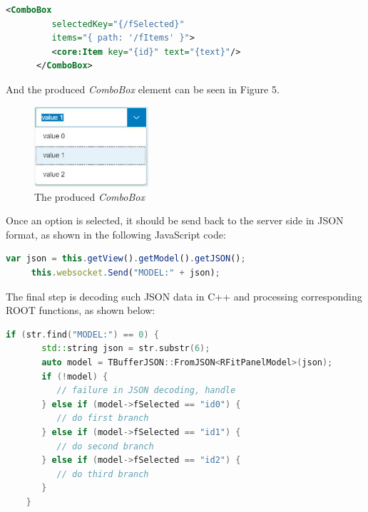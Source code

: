 \documentclass[a4paper]{jpconf}
\begin{document}
\begin{lstlisting}[language=XML,numbers=none]
      <ComboBox
         selectedKey="{/fSelected}"
         items="{ path: '/fItems' }">
         <core:Item key="{id}" text="{text}"/>
      </ComboBox>
\end{lstlisting}

And the produced \textit{ComboBox} element can be seen in Figure 5.

\begin{figure}[h]
  \begin{center}
    \includegraphics[width=10pc]{testCombo.eps}\hspace{2pc}%
  \end{center}
  \centering
\begin{minipage}[b]{20pc}\caption{\label{label}The produced \textit{ComboBox}}
\end{minipage}
\end{figure}

\newpage
Once an option is selected, it should be send back to the server side in JSON format, as shown in the following JavaScript code:

\begin{lstlisting}[language=JavaScript,numbers=none]
     var json = this.getView().getModel().getJSON();
     this.websocket.Send("MODEL:" + json);
\end{lstlisting}

The final step is decoding such JSON data in C++ and processing corresponding ROOT functions, as shown below:

\begin{lstlisting}[language=C++,numbers=none]
    if (str.find("MODEL:") == 0) {
       std::string json = str.substr(6);
       auto model = TBufferJSON::FromJSON<RFitPanelModel>(json);
       if (!model) {
          // failure in JSON decoding, handle
       } else if (model->fSelected == "id0") {
          // do first branch
       } else if (model->fSelected == "id1") {
          // do second branch
       } else if (model->fSelected == "id2") {
          // do third branch
       }
    }
\end{lstlisting}
\end{document}
